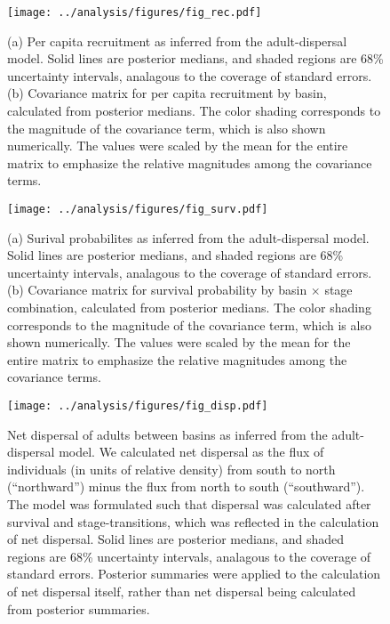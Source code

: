 \documentclass[11pt]{article}
\begin{document}
\clearpage
\begin{figure}
\centering
\texttt{[image: ../analysis/figures/fig\_rec.pdf]}
\caption{\label{fig:rec}
(a) Per capita recruitment as inferred from the adult-dispersal model.
Solid lines are posterior medians,
and shaded regions are 68\% uncertainty intervals, 
analagous to the coverage of standard errors.
(b) Covariance matrix for per capita recruitment by basin,
calculated from posterior medians.
The color shading corresponds to the magnitude of the covariance term,
which is also shown numerically. 
The values were scaled by the mean for the entire matrix to emphasize 
the relative magnitudes among the covariance terms.
}
\end{figure}
\clearpage

\clearpage
\begin{figure}
\centering
\texttt{[image: ../analysis/figures/fig\_surv.pdf]}
\caption{\label{fig:surv}
(a) Surival probabilites as inferred from the adult-dispersal model.
Solid lines are posterior medians,
and shaded regions are 68\% uncertainty intervals, 
analagous to the coverage of standard errors.
(b) Covariance matrix for survival probability by basin $\times$ stage combination,
calculated from posterior medians.
The color shading corresponds to the magnitude of the covariance term,
which is also shown numerically. 
The values were scaled by the mean for the entire matrix to emphasize 
the relative magnitudes among the covariance terms.
}
\end{figure}
\clearpage

\clearpage
\begin{figure}
\centering
\texttt{[image: ../analysis/figures/fig\_disp.pdf]}
\caption{\label{fig:disp}
Net dispersal of adults between basins as inferred from the adult-dispersal model.
We calculated net dispersal as the flux of individuals (in units of relative density)
from south to north (``northward'') minus the flux from north to south (``southward'').
The model was formulated such that dispersal was calculated after survival and stage-transitions,
which was reflected in the calculation of net dispersal.
Solid lines are posterior medians,
and shaded regions are 68\% uncertainty intervals, 
analagous to the coverage of standard errors.
Posterior summaries were applied to the calculation of net dispersal itself,
rather than net dispersal being calculated from posterior summaries.
}
\end{figure}
\clearpage
\end{document}
